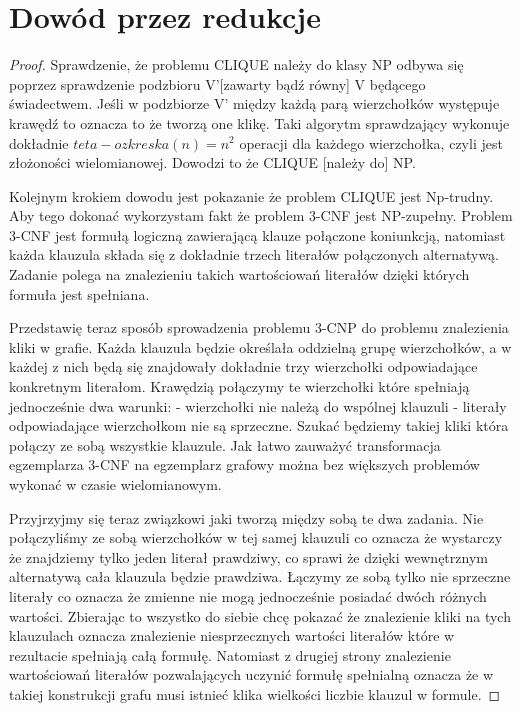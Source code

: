\section{Dowód przez redukcje}
\begin{proof}
Sprawdzenie, że problemu CLIQUE należy do klasy NP odbywa się poprzez sprawdzenie podzbioru V'[zawarty bądź równy] V będącego świadectwem. Jeśli w podzbiorze V' między każdą parą wierzchołków występuje krawędź to oznacza to że tworzą one klikę. Taki algorytm sprawdzający wykonuje dokładnie  $teta - o zkreska(n) = n^2$ operacji dla każdego wierzchołka, czyli jest złożoności wielomianowej. Dowodzi to że CLIQUE [należy do] NP.

Kolejnym krokiem dowodu jest pokazanie że problem CLIQUE jest Np-trudny. Aby tego dokonać wykorzystam fakt że problem 3-CNF jest NP-zupełny. Problem 3-CNF jest formułą logiczną zawierającą klauze połączone koniunkcją, natomiast każda klauzula składa się z dokładnie trzech literałów połączonych alternatywą. Zadanie polega na znalezieniu takich wartościowań literałów dzięki których formuła jest spełniana. 

Przedstawię teraz sposób sprowadzenia problemu 3-CNP do problemu znalezienia kliki w grafie. Każda klauzula będzie określała oddzielną grupę wierzchołków, a w każdej z nich będą się znajdowały dokładnie trzy wierzchołki odpowiadające konkretnym literałom. Krawędzią połączymy te wierzchołki które spełniają jednocześnie dwa warunki:
- wierzchołki nie należą do wspólnej klauzuli
- literały odpowiadające wierzchołkom nie są sprzeczne.
 Szukać będziemy takiej kliki która połączy ze sobą wszystkie klauzule. Jak łatwo zauważyć transformacja egzemplarza 3-CNF na egzemplarz grafowy można bez większych problemów wykonać w czasie wielomianowym.

Przyjrzyjmy się teraz związkowi jaki tworzą między sobą te dwa zadania. Nie połączyliśmy ze sobą wierzchołków w tej samej klauzuli co oznacza że wystarczy że znajdziemy tylko jeden literał prawdziwy, co sprawi że dzięki wewnętrznym alternatywą cała klauzula będzie prawdziwa. Łączymy ze sobą tylko nie sprzeczne literały co oznacza że zmienne nie mogą jednocześnie posiadać dwóch różnych wartości. Zbierając to wszystko do siebie chcę pokazać że znalezienie kliki na tych klauzulach oznacza znalezienie niesprzecznych wartości literałów które w rezultacie spełniają całą formułę. Natomiast z drugiej strony znalezienie wartościowań literałów pozwalających uczynić formułę spełnialną oznacza że w takiej konstrukcji grafu musi istnieć klika wielkości liczbie klauzul w formule.  


























\end{proof}
